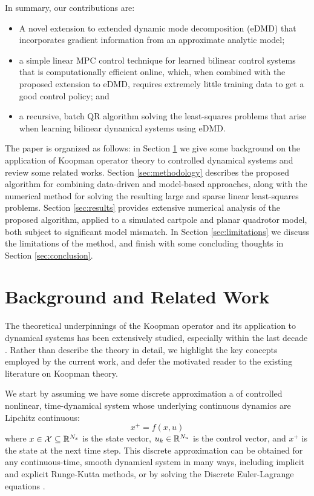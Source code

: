 \documentclass{article}
\begin{document}
In summary, our contributions are:
\begin{itemize}
  \item A novel extension to extended dynamic mode decomposition (eDMD) that
  incorporates gradient information from an approximate analytic model;
  
  \item a simple linear MPC control technique for learned bilinear control systems
  that is computationally efficient online, which, when combined with the proposed
  extension to eDMD, requires extremely little training data to get a good control
  policy; and
  
  \item a recursive, batch QR algorithm solving the least-squares problems that arise 
  when learning bilinear dynamical systems using eDMD.
\end{itemize}

The paper is organized as follows: in Section \ref{sec:Preliminaries/Background} we 
give some background on the application of Koopman operator theory to controlled 
dynamical systems and review some related works. Section \ref{sec:methodology} describes
the proposed algorithm for combining data-driven and model-based approaches, along with 
the numerical method for solving the resulting large and sparse linear least-squares 
problems. Section \ref{sec:results} provides extensive numerical analysis of the 
proposed algorithm, applied to a simulated cartpole and planar quadrotor model, both 
subject to significant model mismatch. In Section \ref{sec:limitations} we discuss the 
limitations of the method, and finish with some concluding thoughts in Section 
\ref{sec:conclusion}.

\section{Background and Related Work} \label{sec:Preliminaries/Background}

The theoretical underpinnings of the Koopman operator and its application to dynamical
systems has been extensively studied, especially within the last decade 
\cite{Fasel2021,Proctor2018,Bruder2021,Williams2015}. Rather than describe the theory in
detail, we highlight the key concepts employed by the current work, and defer the
motivated reader to the existing literature on Koopman theory.

We start by assuming we have some discrete approximation a of controlled nonlinear,
time-dynamical system whose underlying continuous dynamics are Lipchitz continuous:
\begin{equation} \label{eq:discrete_dynamics} 
  x^+ = f(x, u) 
\end{equation} 
where $x \in \mathcal{X} \subseteq \mathbb{R}^{N_x}$ is the state vector, $u_k \in \mathbb{R}^{N_u}$ is
the control vector, and $x^+$ is the state at the next time step. This discrete
approximation can be obtained for any continuous-time, smooth dynamical system in many
ways, including implicit and explicit Runge-Kutta methods, or by solving the Discrete
Euler-Lagrange equations \cite{Brudigam2021a,Brudigam2021,Howell2022}.
\end{document}
